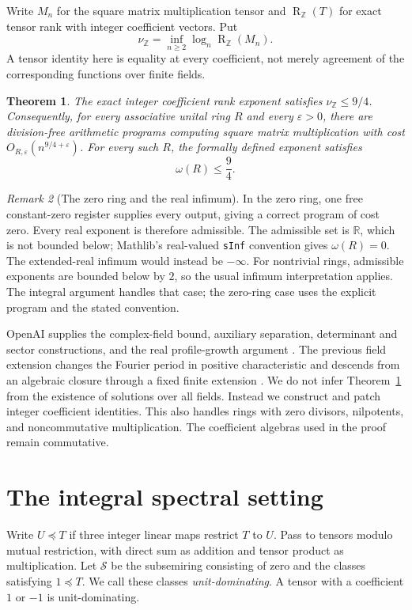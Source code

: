 \documentclass[11pt]{article}
\newtheorem{theorem}{Theorem}[section]
\theoremstyle{remark}
\newtheorem{remark}[theorem]{Remark}
\DeclareMathOperator{\rk}{R}
\newcommand{\Z}{\mathbb Z}
\newcommand{\eps}{\varepsilon}
\newcommand{\res}{\preceq}
\numberwithin{equation}{section}
\begin{document}
Write $M_n$ for the square matrix multiplication tensor and $\rk_\Z(T)$
for exact tensor rank with integer coefficient vectors. Put
\[
 \nu_\Z=\inf_{n\geq2}\log_n\rk_\Z(M_n).
\]
A tensor identity here is equality at every coefficient, not merely
agreement of the corresponding functions over finite fields.

\begin{theorem}\label{thm:main}
The exact integer coefficient rank exponent satisfies $\nu_\Z\leq9/4$.
Consequently, for every associative unital ring $R$ and every $\eps>0$,
there are division-free arithmetic programs computing square matrix
multiplication with cost $O_{R,\eps}(n^{9/4+\eps})$.
For every such $R$, the formally defined exponent satisfies
\[
 \omega(R)\leq\frac94.
\]
\end{theorem}

\begin{remark}[The zero ring and the real infimum]\label{rem:zero-ring}
In the zero ring, one free constant-zero register supplies every output,
giving a correct program of cost zero. Every real exponent is therefore
admissible. The admissible set is $\mathbb R$, which is not bounded below;
Mathlib's real-valued \texttt{sInf} convention gives $\omega(R)=0$.
The extended-real infimum would instead be $-\infty$.
For nontrivial rings, admissible exponents are bounded below by $2$, so the
usual infimum interpretation applies. The integral argument handles that
case; the zero-ring case uses the explicit program and the stated convention.
\end{remark}

OpenAI supplies the complex-field bound, auxiliary separation,
determinant and sector constructions, and the real profile-growth
argument \cite{OAI,OAILean}. The previous field extension changes the
Fourier period in positive characteristic and descends from an algebraic
closure through a fixed finite extension \cite{Fields}. We do not infer
Theorem~\ref{thm:main} from the existence of solutions over all fields.
Instead we construct and patch integer coefficient identities. This also
handles rings with zero divisors, nilpotents, and noncommutative
multiplication. The coefficient algebras used in the proof remain
commutative.

\section{The integral spectral setting}

Write $U\res T$ if three integer linear maps restrict $T$ to $U$.
Pass to tensors modulo mutual restriction, with direct sum as addition
and tensor product as multiplication. Let $\mathcal S$ be the subsemiring
consisting of zero and the classes satisfying $1\res T$.
We call these classes \emph{unit-dominating}. A tensor with a coefficient
$1$ or $-1$ is unit-dominating.
\end{document}
